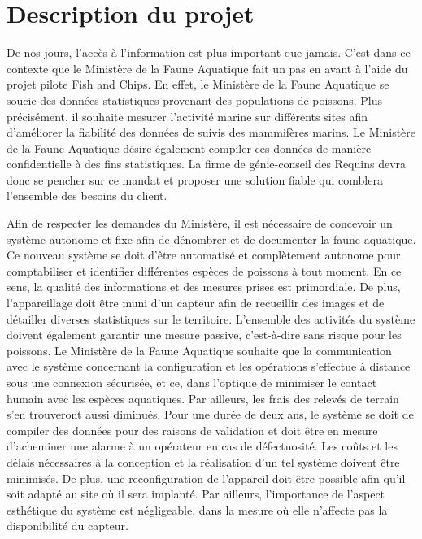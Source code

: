 
%
%

\chapter{Description du projet}
\label{s:structure_rapport}

De nos jours, l'accès à l'information est plus important que jamais. C'est dans ce contexte que le Ministère de la Faune Aquatique fait un pas en avant à l'aide du projet pilote Fish and Chips. En effet, le Ministère de la Faune Aquatique se soucie des données statistiques provenant des populations de poissons. Plus précisément, il souhaite mesurer l'activité marine sur différents sites afin d'améliorer la fiabilité des données de suivis des mammifères marins. Le Ministère de la Faune Aquatique désire également compiler ces données de manière confidentielle à des fins statistiques. La firme de génie-conseil des Requins devra donc se pencher sur ce mandat et proposer une solution fiable qui comblera l'ensemble des besoins du client.

Afin de respecter les demandes du Ministère, il est nécessaire de concevoir un système autonome et fixe afin de dénombrer et de documenter la faune aquatique. Ce nouveau système se doit d'être automatisé et complètement autonome pour comptabiliser et identifier différentes espèces de poissons à tout moment. En ce sens, la qualité des informations et des mesures prises est primordiale. De plus, l'appareillage doit être muni d'un capteur afin de recueillir des images et de détailler diverses statistiques sur le territoire. L'ensemble des activités du système doivent également garantir une mesure passive, c'est-à-dire sans risque pour les poissons. Le Ministère de la Faune Aquatique souhaite que la communication avec le système concernant la configuration et les opérations s'effectue à distance sous une connexion sécurisée, et ce, dans l'optique de minimiser le contact humain avec les espèces aquatiques. Par ailleurs, les frais des relevés de terrain s'en trouveront aussi diminués. Pour une durée de deux ans, le système se doit de compiler des données pour des raisons de validation et doit être en mesure d'acheminer une alarme à un opérateur en cas de défectuosité. Les coûts et les délais nécessaires à la conception et la réalisation d'un tel système doivent être minimisés. De plus, une reconfiguration de l'appareil doit être possible afin qu'il soit adapté au site où il sera implanté. Par ailleurs, l'importance de l'aspect esthétique du système est négligeable, dans la mesure où elle n'affecte pas la disponibilité du capteur.
